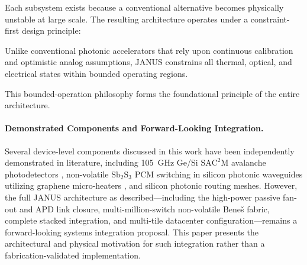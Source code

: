 \documentclass[journal]{IEEEtran}
\begin{document}
Each subsystem exists because a conventional alternative becomes physically unstable at large scale.
The resulting architecture operates under a constraint-first design principle:
\begin{center}
\label{eq:constraint_priority}
\end{center}

Unlike conventional photonic accelerators that rely upon continuous calibration and optimistic analog assumptions, JANUS constrains all thermal, optical, and electrical states within bounded operating regions.

This bounded-operation philosophy forms the foundational principle of the entire architecture.

\paragraph{\textbf{Demonstrated Components and Forward-Looking Integration.}}

Several device-level components discussed in this work have been independently demonstrated in literature, including 105~GHz Ge/Si $\mathrm{SAC^2M}$ avalanche photodetectors \cite{Chen2025}, non-volatile $\mathrm{Sb_2S_3}$ PCM switching in silicon photonic waveguides utilizing graphene micro-heaters \cite{Delaney2020,Rios2021}, and silicon photonic routing meshes. However, the full JANUS architecture as described---including the high-power passive
fan-out and APD link closure, multi-million-switch non-volatile Beneš fabric, complete stacked integration, and multi-tile datacenter configuration---remains a forward-looking systems integration proposal. This paper presents the architectural and physical motivation for such integration rather than a fabrication-validated implementation.
\end{document}
